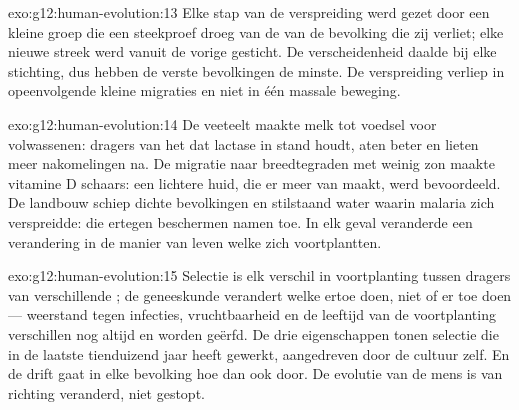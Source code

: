 \begin{solution}{exo:g12:human-evolution:13}
Elke stap van de verspreiding werd gezet door een kleine groep die een
steekproef droeg van de  van de bevolking die zij verliet; elke
nieuwe streek werd vanuit de vorige gesticht. De verscheidenheid daalde
bij elke stichting, dus hebben de verste bevolkingen de minste. De
verspreiding verliep in opeenvolgende kleine migraties en niet in één
massale beweging.
\end{solution}

\begin{solution}{exo:g12:human-evolution:14}
De veeteelt maakte melk tot voedsel voor volwassenen: dragers van het
 dat lactase in stand houdt, aten beter en lieten meer nakomelingen
na. De migratie naar breedtegraden met weinig zon maakte vitamine D
schaars: een lichtere huid, die er meer van maakt, werd bevoordeeld. De
landbouw schiep dichte bevolkingen en stilstaand water waarin malaria zich
verspreidde:  die ertegen beschermen namen toe. In elk geval
veranderde een verandering in de manier van leven welke  zich
voortplantten.
\end{solution}

\begin{solution}{exo:g12:human-evolution:15}
Selectie is elk verschil in voortplanting tussen dragers van verschillende
; de geneeskunde verandert welke  ertoe doen, niet of er
 toe doen --- weerstand tegen infecties, vruchtbaarheid en de
leeftijd van de voortplanting verschillen nog altijd en worden geërfd. De
drie eigenschappen tonen selectie die in de laatste tienduizend jaar heeft
gewerkt, aangedreven door de cultuur zelf. En de drift gaat in elke
bevolking hoe dan ook door. De evolutie van de mens is van richting
veranderd, niet gestopt.
\end{solution}

